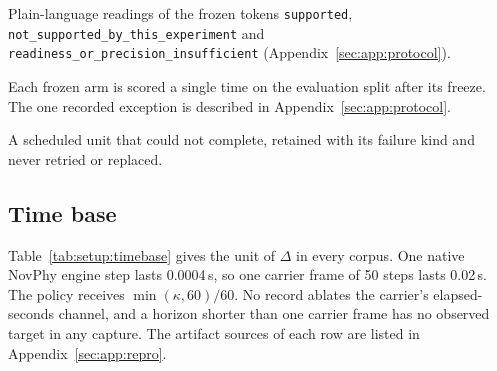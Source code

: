 \begin{revblock}
\begin{description}[leftmargin=1em, itemsep=1pt]
\item[Supported, not supported, insufficient.] Plain-language readings of the frozen tokens \texttt{supported}, \texttt{not\_supported\_by\_this\_experiment} and \texttt{readiness\_or\_precision\_insufficient} (Appendix~\ref{sec:app:protocol}).
\item[Scored once.] Each frozen arm is scored a single time on the evaluation split after its freeze. The one recorded exception is described in Appendix~\ref{sec:app:protocol}.
\item[Typed failure.] A scheduled unit that could not complete, retained with its failure kind and never retried or replaced.
\end{description}

\subsection{Time base}

Table~\ref{tab:setup:timebase} gives the unit of $\Delta$ in every corpus. One native NovPhy engine step lasts 0.0004\,s, so one carrier frame of 50 steps lasts 0.02\,s. The policy receives $\min(\kappa,60)/60$. No record ablates the carrier's elapsed-seconds channel, and a horizon shorter than one carrier frame has no observed target in any capture. The artifact sources of each row are listed in Appendix~\ref{sec:app:repro}.
\end{revblock}

